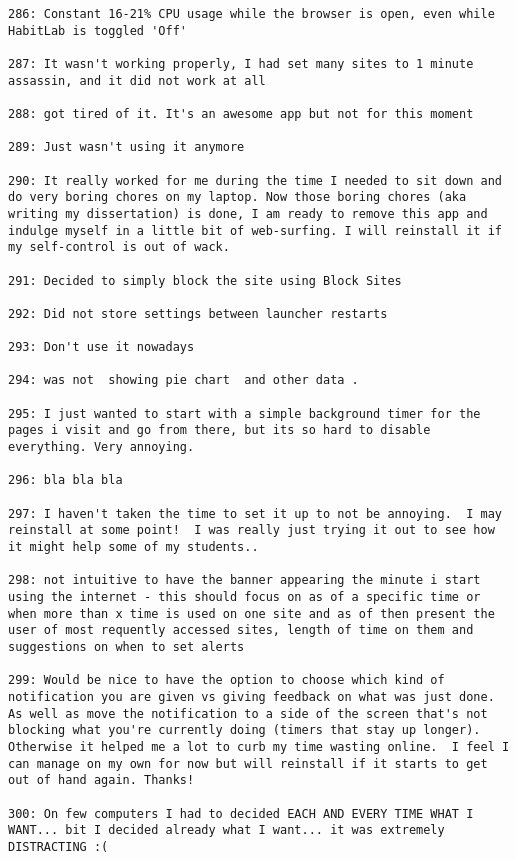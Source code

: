 \begin{lstlisting}[breaklines]
286: Constant 16-21% CPU usage while the browser is open, even while HabitLab is toggled 'Off'

287: It wasn't working properly, I had set many sites to 1 minute assassin, and it did not work at all

288: got tired of it. It's an awesome app but not for this moment

289: Just wasn't using it anymore

290: It really worked for me during the time I needed to sit down and do very boring chores on my laptop. Now those boring chores (aka writing my dissertation) is done, I am ready to remove this app and indulge myself in a little bit of web-surfing. I will reinstall it if my self-control is out of wack.

291: Decided to simply block the site using Block Sites

292: Did not store settings between launcher restarts

293: Don't use it nowadays

294: was not  showing pie chart  and other data .

295: I just wanted to start with a simple background timer for the pages i visit and go from there, but its so hard to disable everything. Very annoying.

296: bla bla bla

297: I haven't taken the time to set it up to not be annoying.  I may reinstall at some point!  I was really just trying it out to see how it might help some of my students..

298: not intuitive to have the banner appearing the minute i start using the internet - this should focus on as of a specific time or when more than x time is used on one site and as of then present the user of most requently accessed sites, length of time on them and suggestions on when to set alerts

299: Would be nice to have the option to choose which kind of notification you are given vs giving feedback on what was just done.  As well as move the notification to a side of the screen that's not blocking what you're currently doing (timers that stay up longer).  Otherwise it helped me a lot to curb my time wasting online.  I feel I can manage on my own for now but will reinstall if it starts to get out of hand again. Thanks!

300: On few computers I had to decided EACH AND EVERY TIME WHAT I WANT... bit I decided already what I want... it was extremely DISTRACTING :(


\end{lstlisting}
